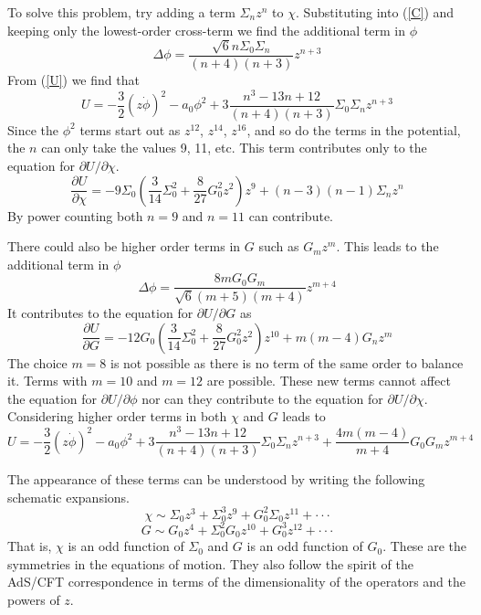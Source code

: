 \documentclass[12pt]{article}
\newcommand{\be}{\begin{equation}}
\newcommand{\ee}{\end{equation}}
\newcommand{\bd}{\begin{displaymath}}
\newcommand{\ed}{\end{displaymath}}
\def\tthalf{{\textstyle{\frac{3}{2}}}}
\def\phidot{\dot{\phi}}
\def\rt6{\sqrt{6}}
\begin{document}
To solve this problem, try adding a term $\Sigma_n z^n$ to $\chi$.  
Substituting into (\ref{C}) and keeping only the lowest-order cross-term we find the additional term in $\phi$
\be
\Delta \phi = \frac{\rt6 n \Sigma_0 \Sigma_n}{(n+4)(n+3)} z^{n+3}
\ee
From (\ref{U}) we find that
\be
U = -\tthalf (z\phidot)^2 - a_0\phi^2 +3 \frac{n^3 -13n +12}{(n+4)(n+3)} \Sigma_0 \Sigma_n z^{n+3}
\ee
Since the $\phi^2$ terms start out as $z^{12}$, $z^{14}$, $z^{16}$, and so do the terms in the potential, the $n$ can only take the values 9, 11, etc.  
This term contributes only to the equation for $\partial U/\partial \chi$.
\be
\frac{\partial U}{\partial \chi} = -9\Sigma_0 \left( \frac{3}{14} \Sigma_0^2 + \frac{8}{27} G_0^2 z^2 \right) z^9 + (n-3)(n-1) \Sigma_n z^n
\ee
By power counting both $n=9$ and $n=11$ can contribute.  

There could also be higher order terms in $G$ such as $G_m z^m$.  
This leads to the additional term in $\phi$
\be
\Delta \phi = \frac{8 m G_0 G_m}{\rt6 (m+5)(m+4)} z^{m+4}
\ee
It contributes to the equation for $\partial U/\partial G$ as
\be
\frac{\partial U}{\partial G} = -12G_0 \left( \frac{3}{14} \Sigma_0^2 + \frac{8}{27} G_0^2 z^2 \right) z^{10}
+ m (m-4) G_n z^m
\ee
The choice $m=8$ is not possible as there is no term of the same order to balance it.  
Terms with $m=10$ and $m=12$ are possible.  
These new terms cannot affect the equation for $\partial U/\partial \phi$  nor can they contribute to the equation for $\partial U/\partial \chi$.  
Considering higher order terms in both $\chi$ and $G$ leads to
\be
U = -\tthalf (z\phidot)^2 - a_0\phi^2 +3 \frac{n^3 -13n +12}{(n+4)(n+3)} \Sigma_0 \Sigma_n z^{n+3}
+ \frac{4m(m-4)}{m+4} G_0 G_m z^{m+4}
\ee 

The appearance of these terms can be understood by writing the following schematic expansions.
\bd
\chi \sim \Sigma_0 z^3 + \Sigma_0^3 z^9 + G_0^2 \Sigma_0 z^{11} + \cdot\cdot\cdot
\ed
\bd
G \sim G_0 z^4 + \Sigma_0^2 G_0 z^{10} + G_0^3 z^{12} + \cdot\cdot\cdot
\ed
That is, $\chi$ is an odd function of $\Sigma_0$ and $G$ is an odd function of $G_0$.  
These are the symmetries in the equations of motion.  
They also follow the spirit of the AdS/CFT correspondence in terms of the dimensionality of the operators and the powers of $z$.
\end{document}
